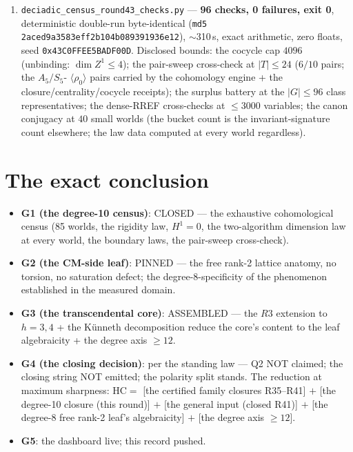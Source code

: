 \documentclass[11pt]{article}
\begin{document}
\begin{enumerate}
\item \texttt{deciadic\_census\_round43\_checks.py} --- \textbf{96 checks,
0 failures, exit 0}, deterministic double-run byte-identical
(\texttt{md5 2aced9a3583eff2b104b089391936e12}), $\sim$310\,s, exact
arithmetic, zero floats, seed \texttt{0x43C0FFEE5BADF00D}. Disclosed
bounds: the cocycle cap $4096$ (unbinding: $\dim Z^1 \le 4$); the
pair-sweep cross-check at $|T| \le 24$ ($6/10$ pairs; the $A_5/S_5$-
$\langle\rho_0\rangle$ pairs carried by the cohomology engine + the
closure/centrality/cocycle receipts); the surplus battery at the
$|G| \le 96$ class representatives; the dense-RREF cross-checks at
$\le 3000$ variables; the canon conjugacy at $40$ small worlds (the bucket
count is the invariant-signature count elsewhere; the law data computed at
every world regardless).
\end{enumerate}

\section{The exact conclusion}

\begin{itemize}
\item \textbf{G1 (the degree-10 census)}: CLOSED --- the exhaustive
cohomological census (85 worlds, the rigidity law, $H^1 = 0$, the
two-algorithm dimension law at every world, the boundary laws, the
pair-sweep cross-check).
\item \textbf{G2 (the CM-side leaf)}: PINNED --- the free rank-2 lattice
anatomy, no torsion, no saturation defect; the degree-8-specificity of the
phenomenon established in the measured domain.
\item \textbf{G3 (the transcendental core)}: ASSEMBLED --- the $R3$
extension to $h = 3, 4$ + the K\"unneth decomposition reduce the core's
content to the leaf algebraicity + the degree axis $\ge 12$.
\item \textbf{G4 (the closing decision)}: per the standing law --- Q2 NOT
claimed; the closing string NOT emitted; the polarity split stands. The
reduction at maximum sharpness:
$\mathrm{HC} = $ [the certified family closures R35--R41] $+$ [the degree-10
closure (this round)] $+$ [the general input (closed R41)] $+$ [the degree-8
free rank-2 leaf's algebraicity] $+$ [the degree axis $\ge 12$].
\item \textbf{G5}: the dashboard live; this record pushed.
\end{itemize}
\end{document}
